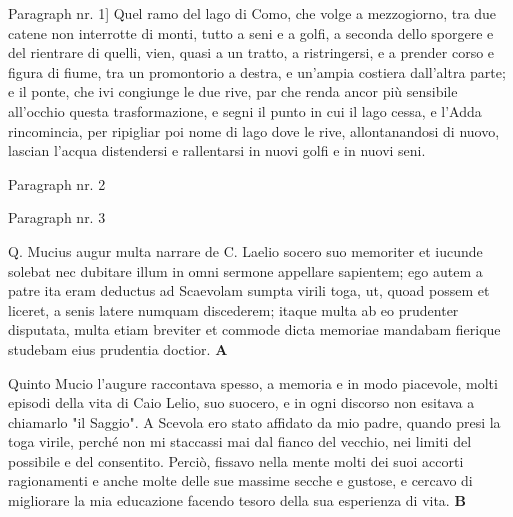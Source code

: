 \documentclass[b5paper]{book}
\begin{document}
\beginnumbering
\numberpstarttrue

\pstart
    Paragraph nr. 1] Quel ramo del lago di Como, che volge a mezzogiorno, tra due catene non interrotte di monti, tutto a seni e a golfi, a seconda dello sporgere e del rientrare di quelli, vien, quasi a un tratto, a ristringersi, e a prender corso e figura di fiume, tra un promontorio a destra, e un'ampia costiera dall'altra parte; e il ponte, che ivi congiunge le due rive, par che renda ancor più sensibile all'occhio questa trasformazione, e segni il punto in cui il lago cessa, e l'Adda rincomincia, per ripigliar poi nome di lago dove le rive, allontanandosi di nuovo, lascian l'acqua distendersi e rallentarsi in nuovi golfi e in nuovi seni.
\pend

\pstart{}%
    Paragraph nr. 2%
\pend

\pstart{}%
    Paragraph nr. 3%
\pend

\pausenumbering
\begin{pairs}
\begin{Leftside}
\resumenumbering
\numberpstartfalse
    \pstart\noindent Q. Mucius augur multa narrare de C. Laelio socero suo memoriter et iucunde solebat nec dubitare illum in omni sermone appellare sapientem; ego autem a patre ita eram deductus ad Scaevolam sumpta virili toga, ut, quoad possem et liceret, a senis latere numquam discederem; itaque multa ab eo prudenter disputata, multa etiam breviter et commode dicta memoriae mandabam fierique studebam eius prudentia doctior. \textbf{A}\pend
\pausenumbering
\end{Leftside}

\begin{Rightside}
\beginnumbering
\numberpstartfalse
    \pstart\noindent Quinto Mucio l'augure raccontava spesso, a memoria e in modo piacevole, molti episodi della vita di Caio Lelio, suo suocero, e in ogni discorso non esitava a chiamarlo "il Saggio". A Scevola ero stato affidato da mio padre, quando presi la toga virile, perché non mi staccassi mai dal fianco del vecchio, nei limiti del possibile e del consentito. Perciò, fissavo nella mente molti dei suoi accorti ragionamenti e anche molte delle sue massime secche e gustose, e cercavo di migliorare la mia educazione facendo tesoro della sua esperienza di vita. \textbf{B}\pend
\pausenumbering
\end{Rightside}
\end{pairs}
\Columns
\end{document}
